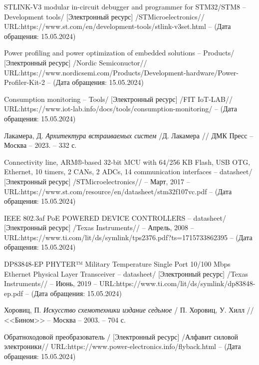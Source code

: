 \begin{thebibliography}{00}



 STLINK-V3 modular in-circuit debugger and programmer for STM32/STM8
-- Development tools/
[Электронный ресурс]
/STMicroelectronics//
URL:https://www.st.com/en/development-tools/stlink-v3set.html --
(Дата обращения: 15.05.2024)

 Power profiling and power optimization of embedded solutions
-- Products/
[Электронный ресурс]
/Nordic Semiconuctor//
URL:https://www.nordicsemi.com/Products/Development-hardware/Power-Profiler-Kit-2 --
(Дата обращения: 15.05.2024)

 Consumption monitoring
-- Tools/
[Электронный ресурс]
/FIT IoT-LAB//
URL:https://www.iot-lab.info/docs/tools/consumption-monitoring/ --
(Дата обращения: 15.05.2024)


 Лакамера, Д.
\emph{Архитектура встраиваемых систем} /Д. Лакамера // ДМК Пресс --
Москва -- 2023. -- 332 с.

 Connectivity line, ARM®-based 32-bit MCU with 64/256 KB Flash,
 USB OTG, Ethernet, 10 timers, 2 CANs, 2 ADCs, 14 communication interfaces -- datasheet/
  [Электронный ресурс]
 /STMicroelectronics// -- Март, 2017 -- 
 URL:https://www.st.com/resource/en/datasheet/stm32f107vc.pdf --
 (Дата обращения: 15.05.2024)

 IEEE 802.3af PoE POWERED DEVICE CONTROLLERS -- datasheet/
  [Электронный ресурс] /Texas Instruments// -- Апрель, 2008 
  -- URL:https://www.ti.com/lit/ds/symlink/tps2376.pdf?ts=1715733862395 --
  (Дата обращения: 15.05.2024)

 DP83848-EP PHYTER™ Military Temperature Single Port
   10/100 Mbps Ethernet
  Physical Layer Transceiver -- datasheet/
  [Электронный ресурс] /Texas Instruments// -- Июнь, 2019 
  -- URL:https://www.ti.com/lit/ds/symlink/dp83848-ep.pdf --
  (Дата обращения: 15.05.2024)

 Хоровиц, П.
\emph{Искусство схемотехники издание седьмое} / П. Хоровиц, У. Хилл // <<Бином>> --
Москва -- 2003. -- 704 с.

 Обратноходовой преобразователь /
  [Электронный ресурс] /Алфавит силовой электроники// 
   URL:https://www.power-electronics.info/flyback.html --
  (Дата обращения: 15.05.2024)


\end{thebibliography}
